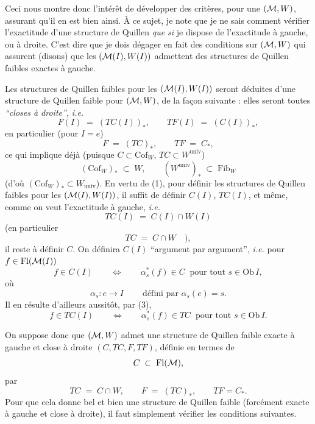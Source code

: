 Ceci nous montre donc l'intérêt de développer des critères, pour une $(\mathcal{M},W)$, assurant qu'il en est bien ainsi. À ce sujet, je note que je ne sais comment vérifier l'exactitude d'une structure de Quillen \textit{que si} je dispose de l'exactitude à gauche, ou à droite. C'est dire que je dois dégager en fait des conditions sur $(\mathcal{M},W)$ qui assurent (disons) que les $(\mathcal{M}(I),W(I))$ admettent des structures de Quillen faibles exactes à gauche.

Les structures de Quillen faibles pour les $(\mathcal{M}(I),W(I))$ seront déduites d'une structure de Quillen faible pour $(\mathcal{M},W)$, de la façon suivante : elles seront toutes \textit{“closes à droite”,} \textit{i.e.}
\[
F(I) \;=\; (TC(I))_*, \qquad TF(I) \;=\; (C(I))_*, \tag*{(1)}
\]
en particulier (pour $I=e$)
\[
F \;=\; (TC)_*, \qquad TF \;=\; C_*,
\]
ce qui implique déjà (puisque $C\subset \mathrm{Cof}_W$, $TC\subset W^{\mathrm{univ}}$)
\[
(\mathrm{Cof}_W)_* \;\subset\; W, \qquad (W^{\mathrm{univ}})_* \;\subset\; \mathrm{Fib}_W \tag*{(2)}
\]
(d'où $(\mathrm{Cof}_W)_*\subset W_{\mathrm{univ}}$). En vertu de (1), pour définir les structures de Quillen faibles pour les $(\mathcal{M}(I),W(I))$, il suffit de définir $C(I)$, $TC(I)$, et même, comme on veut l'exactitude à gauche, \textit{i.e.}
\[
TC(I) \;=\; C(I)\cap W(I) \tag*{(3)}
\]
(en particulier
\[
TC \;=\; C\cap W \quad ), \tag*{(4)}
\]
il reste à définir $C$. On définira $C(I)$ “argument par argument”, \textit{i.e.} pour $f\in\mathrm{Fl}(\mathcal{M}(I))$
\[
f\in C(I) \qquad\Longleftrightarrow\qquad \alpha_s^*(f)\in C \ \text{ pour tout } s\in\mathrm{Ob}\,I, \tag*{(5)}
\]
où
\[
\alpha_s : e\longrightarrow I \qquad \ \text{défini par } \alpha_s(e)=s.
\]
Il en résulte d'ailleurs aussitôt, par (3),
\[
f\in TC(I) \qquad\Longleftrightarrow\qquad \alpha_s^*(f)\in TC \ \text{ pour tout } s\in\mathrm{Ob}\,I. \tag*{(6)}
\]

On suppose donc que $(\mathcal{M},W)$ admet une structure de Quillen faible exacte à gauche et close à droite $(C,TC,F,TF)$, définie en termes de
\[
C\;\subset\;\mathrm{Fl}(\mathcal{M}),
\]
par
\[
TC \;=\; C\cap W, \qquad F \;=\; (TC)_*, \qquad TF = C_*.
\]
Pour que cela donne bel et bien une structure de Quillen faible (forcément exacte à gauche et close à droite), il faut simplement vérifier les conditions suivantes.

